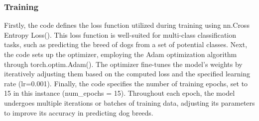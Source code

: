 \subsubsection{Training}
Firstly, the code defines the loss function utilized during training using nn.Cross Entropy Loss(). This loss function is well-suited for multi-class classification tasks, such as predicting the breed of dogs from a set of potential classes. Next, the code sets up the optimizer, employing the Adam optimization algorithm through torch.optim.Adam(). The optimizer fine-tunes the model's weights by iteratively adjusting them based on the computed loss and the specified learning rate (lr=0.001). Finally, the code specifies the number of training epochs, set to 15 in this instance (num\_epochs = 15). Throughout each epoch, the model undergoes multiple iterations or batches of training data, adjusting its parameters to improve its accuracy in predicting dog breeds.
